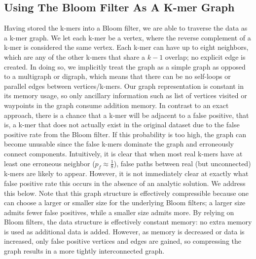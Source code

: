 \documentclass[12pt]{article} \usepackage{simplemargins}
\begin{document}
\subsection{Using The Bloom Filter As A K-mer Graph}
Having stored the k-mers into a Bloom filter, we are able to traverse
the data as a k-mer graph. We let each k-mer be a vertex, where
the reverse complement of a k-mer is considered the same
vertex. Each k-mer can
have up to eight neighbors, which are any of the other k-mers that
 share a $k-1$
overlap; no explicit edge is created. In doing so, we implicitly 
treat the graph as a simple graph as opposed to a multigraph or 
digraph, which means that there can be no self-loops or parallel 
edges between vertices/k-mers. Our graph representation is constant 
in its memory usage, so only ancillary information such as list 
of vertices visited or waypoints in the graph consume addition 
memory.
In contrast to an exact approach, there is a chance that a k-mer 
will be adjacent to a false positive,
that is, a k-mer
that does not actually exist in the original dataset due to the false
positive rate from the Bloom filter. If this probability is too high, the 
graph can become unusable since the false k-mers dominate the graph 
and erroneously connect components.
Intuitively, it is clear that when most real k-mers
have at least one erroneous neighbor ($p_f \approx \frac{1}{8}$), 
false paths between real (but unconnected) k-mers are likely to 
appear. However, it is not immediately clear at exactly what 
false positive rate this occurs in the absence of an analytic
solution.  We address this below.  %
Note that this graph structure is effectively compressible 
because one can choose a larger
or smaller size for the underlying Bloom filters; a larger size admits fewer
false positives, while a smaller size admits more. By relying on Bloom
filters, the data structure is effectively constant memory: no extra memory is
used as additional data is added. However, as memory is decreased or data
is increased, only false positive vertices and edges are gained, so
compressing the graph results in a more tightly interconnected graph.
\end{document}
